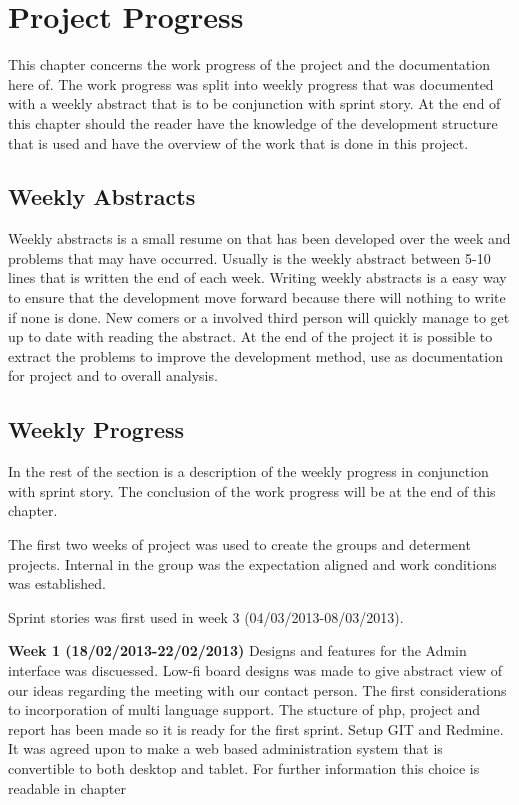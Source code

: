 \chapter{Project Progress}
\label{sec:projectProgress}
This chapter concerns the work progress of the project and the documentation here of. 
The work progress was split into weekly progress that was documented with a weekly abstract that is to be conjunction with sprint story.  
At the end of this chapter should the reader have the knowledge of the development structure that is used and have the overview of the work that is done in this project. 


\section{Weekly Abstracts}      
\label{subsec:weeklyAbstracts}
Weekly abstracts is a small resume on that has been developed over the week and problems that may have occurred. 
Usually is the weekly abstract between 5-10 lines that is written the end of each week. 
Writing weekly abstracts is a easy way to ensure that the development move forward because there will nothing to write if none is done.
New comers or a involved third person will quickly manage to get up to date with reading the abstract. 
At the end of the project it is possible to extract the problems to improve the development method, use as documentation for project and to overall analysis.          

\section{Weekly Progress}
\label{subsec:weeklyProgress}
In the rest of the section is a description of the weekly progress in conjunction with sprint story.
The conclusion of the work progress will be at the end of this chapter. 

The first two weeks of project was used to create the groups and determent projects.  
Internal in the group was the expectation aligned and work conditions was established.   

Sprint stories was first used in week 3 (04/03/2013-08/03/2013).   

\textbf{Week 1 (18/02/2013-22/02/2013)} 
Designs and features for the Admin interface was discuessed.
Low-fi board designs was made to give abstract view of our ideas regarding the meeting with our contact person.   
The first considerations to incorporation of multi language support.
The stucture of php, project and report has been made so it is ready for the first sprint.
Setup GIT and Redmine.
It was agreed upon to make a web based administration system that is convertible to both desktop and tablet.  
For further information this choice is readable in chapter  

